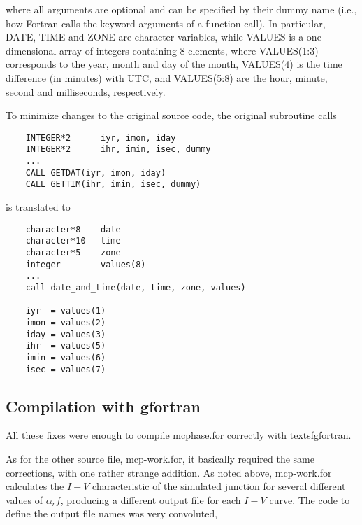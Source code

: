 where all arguments are optional and can be specified by their dummy name (i.e., how Fortran calls the keyword arguments of a function call). In particular, \textsf{DATE}, \textsf{TIME} and \textsf{ZONE} are character variables, while \textsf{VALUES} is a one-dimensional array of integers containing 8 elements, where \textsf{VALUES(1:3)} corresponds to the year, month and day of the month, \textsf{VALUES(4)} is the time difference (in minutes) with UTC, and \textsf{VALUES(5:8)} are the hour, minute, second and milliseconds, respectively.

To minimize changes to the original source code, the original subroutine calls

\begin{lstlisting}
	INTEGER*2      iyr, imon, iday
	INTEGER*2      ihr, imin, isec, dummy
	...
	CALL GETDAT(iyr, imon, iday)
	CALL GETTIM(ihr, imin, isec, dummy)
\end{lstlisting}

is translated to

\begin{lstlisting}
	character*8    date
	character*10   time
	character*5    zone
	integer        values(8)
	...
	call date_and_time(date, time, zone, values)

	iyr  = values(1)
	imon = values(2)
	iday = values(3)
	ihr  = values(5)
	imin = values(6)
	isec = values(7)
\end{lstlisting}




\subsection{Compilation with gfortran}
\label{compilation-with-gfortran}

All these fixes were enough to compile \textsf{mcphase.for} correctly with textsf{gfortran}.

As for the other source file, \textsf{mcp-work.for}, it basically required the same corrections, with one rather strange addition.
As noted above, \textsf{mcp-work.for} calculates the $I - V$ characteristic of the simulated junction for several different values of $\alpha_rf$, producing a different output file for each $I - V$ curve. The code to define the output file names was very convoluted,

